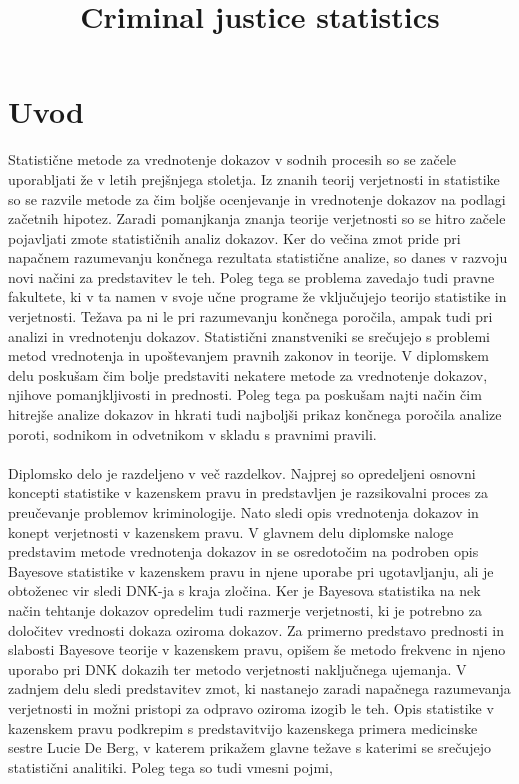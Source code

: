 \documentclass[fin1, tisk]{fmfdelo}
\title{Criminal justice statistics}
\theoremstyle{definition} %
\theoremstyle{trditev} %
\theoremstyle{izrek}
\begin{document}
\section{Uvod}
Statistične metode za vrednotenje dokazov v sodnih procesih so se začele uporabljati že v letih prejšnjega stoletja. Iz znanih teorij verjetnosti in
statistike so se razvile metode za čim boljše ocenjevanje in vrednotenje dokazov na podlagi začetnih hipotez. Zaradi pomanjkanja znanja teorije
verjetnosti so se hitro začele pojavljati zmote statističnih analiz dokazov. Ker do večina zmot pride pri napačnem razumevanju končnega rezultata
statistične analize, so danes v razvoju novi načini za predstavitev le teh. Poleg tega se problema zavedajo tudi pravne fakultete, ki v ta namen v svoje učne
programe že vključujejo teorijo statistike in verjetnosti. Težava pa ni le pri razumevanju končnega poročila, ampak tudi pri analizi in vrednotenju
dokazov. Statistični znanstveniki se srečujejo s problemi metod vrednotenja in upoštevanjem pravnih zakonov in teorije. V diplomskem delu poskušam
čim bolje predstaviti nekatere metode za vrednotenje dokazov, njihove pomanjkljivosti in prednosti. Poleg tega pa poskušam najti način čim hitrejše
analize dokazov in hkrati tudi najboljši prikaz končnega poročila analize poroti, sodnikom in odvetnikom v skladu s pravnimi pravili.\\\\
Diplomsko delo je razdeljeno v več razdelkov. Najprej so opredeljeni osnovni koncepti statistike v kazenskem pravu in predstavljen je 
razsikovalni proces za preučevanje problemov kriminologije. Nato sledi opis vrednotenja dokazov in konept verjetnosti v kazenskem 
pravu. V glavnem delu diplomske naloge predstavim metode vrednotenja dokazov in se osredotočim na podroben opis Bayesove statistike 
v kazenskem pravu in njene uporabe pri ugotavljanju, ali je obtoženec vir sledi DNK-ja s kraja zločina. Ker je Bayesova statistika 
na nek način tehtanje dokazov opredelim tudi razmerje verjetnosti, ki je potrebno za določitev vrednosti dokaza oziroma dokazov. Za 
primerno predstavo prednosti in slabosti Bayesove teorije v kazenskem pravu, opišem še metodo frekvenc in njeno uporabo pri DNK dokazih 
ter metodo verjetnosti naključnega ujemanja. V zadnjem delu sledi predstavitev zmot, ki nastanejo zaradi napačnega razumevanja verjetnosti 
in možni pristopi za odpravo oziroma izogib le teh. Opis statistike v kazenskem pravu podkrepim s predstavitvijo kazenskega primera medicinske 
sestre Lucie De Berg, v katerem prikažem glavne težave s katerimi se srečujejo statistični analitiki. Poleg tega so tudi vmesni pojmi, 
\end{document}
